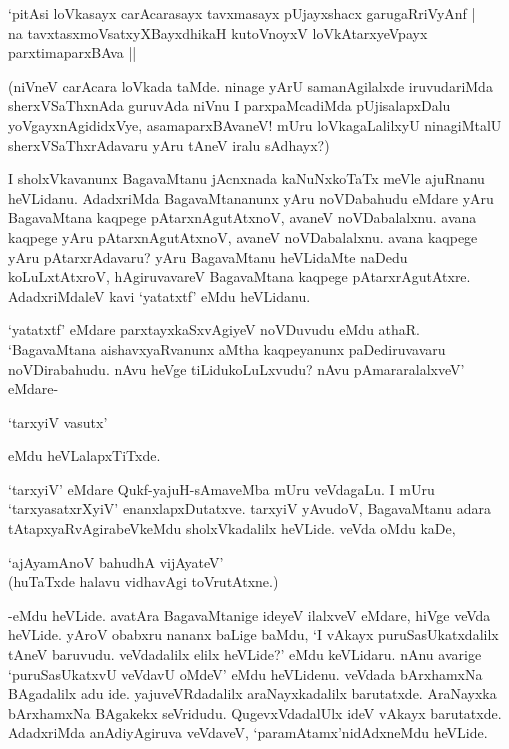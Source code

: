 \begin{shloka}
`pitA\s si loVkasayx carAcarasayx tavxmasayx pUjayxshacx garugaRriVyAnf |\\
na tavxtasxmoV\s satxyXBayxdhikaH kutoV\s noyxV loVkAtarxyeV\s payx parxtimaparxBAva ||
\end{shloka}

(niVneV carAcara loVkada taMde. ninage yArU samanAgilalxde iruvudariMda sherxVSaThxnAda guruvAda niVnu I parxpaMcadiMda pUjisalapxDalu yoVgayxnAgididxVye, asamaparxBAvaneV! mUru loVkagaLalilxyU ninagiMtalU sherxVSaThxrAdavaru yAru tAneV iralu sAdhayx?)

I sholxVkavanunx BagavaMtanu jAcnxnada kaNuNxkoTaTx meVle ajuRnanu heVLidanu. AdadxriMda BagavaMtananunx yAru noVDabahudu eMdare yAru BagavaMtana kaqpege pAtarxnAgutAtxnoV, avaneV noVDabalalxnu. avana kaqpege yAru pAtarxnAgutAtxnoV, avaneV noVDabalalxnu. avana kaqpege yAru pAtarxrAdavaru? yAru BagavaMtanu heVLidaMte naDedu koLuLxtAtxroV, hAgiruvavareV BagavaMtana kaqpege pAtarxrAgutAtxre. AdadxriMdaleV kavi `yatatxtf' eMdu heVLidanu.

`yatatxtf' eMdare parxtayxkaSxvAgiyeV noVDuvudu eMdu athaR. `BagavaMtana aishavxyaRvanunx aMtha kaqpeyanunx paDediruvavaru noVDirabahudu. nAvu heVge tiLidukoLuLxvudu? nAvu pAmararalalxveV' eMdare-

\begin{shloka}
`tarxyiV vasutx'
\end{shloka}

eMdu heVLalapxTiTxde.

`tarxyiV' eMdare Qukf-yajuH-sAmaveMba mUru veVdagaLu. I mUru `tarxyasatxrXyiV' enanxlapxDutatxve. tarxyiV yAvudoV, BagavaMtanu adara tAtapxyaRvAgirabeVkeMdu sholxVkadalilx heVLide. veVda oMdu kaDe,

\begin{shloka}
`ajAyamAnoV bahudhA vijAyateV'\\
(huTaTxde halavu vidhavAgi toVrutAtxne.)
\end{shloka}

-eMdu heVLide. avatAra BagavaMtanige ideyeV ilalxveV eMdare, hiVge veVda heVLide. yAroV obabxru nananx baLige baMdu, `I vAkayx puruSasUkatxdalilx tAneV baruvudu. veVdadalilx elilx heVLide?' eMdu keVLidaru. nAnu avarige `puruSasUkatxvU veVdavU oMdeV' eMdu heVLidenu. veVdada bArxhamxNa BAgadalilx adu ide. yajuveVRdadalilx araNayxkadalilx barutatxde. AraNayxka bArxhamxNa BAgakekx seVridudu. QugevxVdadalUlx ideV vAkayx barutatxde. AdadxriMda anAdiyAgiruva veVdaveV, `paramAtamx'nidAdxneMdu heVLide.

